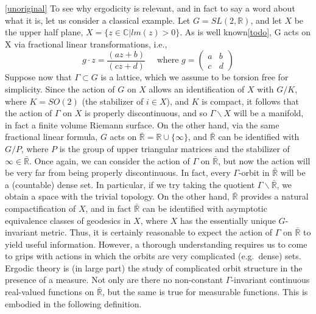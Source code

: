 \documentclass[
  12pt
]{article}
\theoremstyle{break}
\theoremstyle{plain}
\begin{document}
  \href{Zimmer\%20p.4}{{[}unoriginal{]}} To see why ergodicity is
  relevant, and in fact to say a word about what it is, let us consider a
  classical example. Let $G = SL(2, \mathbb{R})$, and let $X$ be the
  upper half plane, $X= \{z \in \mathbb{C} | lm(z) > 0\}$. As is well
  known\href{upper\%20half\%20plane,\%20möbius\%20transforms,\%20give\%20reference\%20to\%20misc\%20things.\%20and\%20figure\%20out\%20what\%20the\%20actual\%20example\%20is.\%20figure\%20out\%20what\%20the\%20theorem\%20tries\%20to\%20answer.}{{[}todo{]}},
  G acts on X via fractional linear transformations, i.e., \[
  g \cdot z=\frac{(az+b)}{(cz+d)}
  \quad
  \text{ where }g=
  \begin{pmatrix}a & b \\ c & d\end{pmatrix}
  \] Suppose now that $\Gamma \subset G$ is a lattice, which we assume
  to be torsion free for simplicity. Since the action of $G$ on $X$
  allows an identification of $X$ with $G/K$, where $K = SO(2)$ (the
  stabilizer of $i \in X$), and $K$ is compact, it follows that the
  action of $\Gamma$ on $X$ is properly discontinuous, and so
  $\Gamma\backslash X$ will be a manifold, in fact a finite volume
  Riemann surface. On the other hand, via the same fractional linear
  formula, $G$ acts on
  $\bar{\mathbb{R}} = \mathbb{R} \cup \{ \infty \}$, and
  $\bar{\mathbb{R}}$ can be identified with $G/P$, where $P$ is the
  group of upper triangular matrices and the stabilizer of
  $\infty \in \bar{\mathbb{R}}$. Once again, we can consider the action
  of $\Gamma$ on $\bar{\mathbb{R}}$, but now the action will be very
  far from being properly discontinuous. In fact, every $\Gamma$-orbit
  in $\bar{\mathbb{R}}$ will be a (countable) dense set. In particular,
  if we try taking the quotient $\Gamma\backslash\bar{\mathbb{R}}$, we
  obtain a space with the trivial topology. On the other hand,
  $\bar{\mathbb{R}}$ provides a natural compactification of $X$, and
  in fact $\bar{\mathbb{R}}$ can be identified with asymptotic
  equivalence classes of geodesics in $X$, where $X$ has the
  essentially unique $G$-invariant metric. Thus, it is certainly
  reasonable to expect the action of $\Gamma$ on $\bar{\mathbb{R}}$ to
  yield useful information. However, a thorough understanding requires us
  to come to grips with actions in which the orbits are very complicated
  (e.g.~dense) sets. Ergodic theory is (in large part) the study of
  complicated orbit structure in the presence of a measure. Not only are
  there no non-constant $\Gamma$-invariant continuous real-valued
  functions on $\bar{\mathbb{R}}$, but the same is true for measurable
  functions. This is embodied in the following definition.
\end{document}
